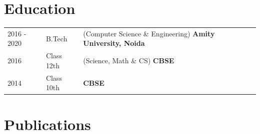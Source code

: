 \documentclass[a4paper,12pt]{article}
\begin{document}
\section{Education}
\begin{tabularx}{\linewidth}{@{}l l X@{}}	

2016 - 2020 & B.Tech & (Computer Science \& Engineering) \hfill \textbf{Amity University, Noida} \\ 

2016 & Class 12th & (Science, Math \& CS) \hfill \textbf{CBSE} \\ 

2014 & Class 10th &  \hfill \textbf{CBSE} \\ 
\end{tabularx}

\section{Publications}
\begin{refsection}
\nocite{*}
\printbibliography[heading=none]
\end{refsection}

\vfill
{}
\end{document}

